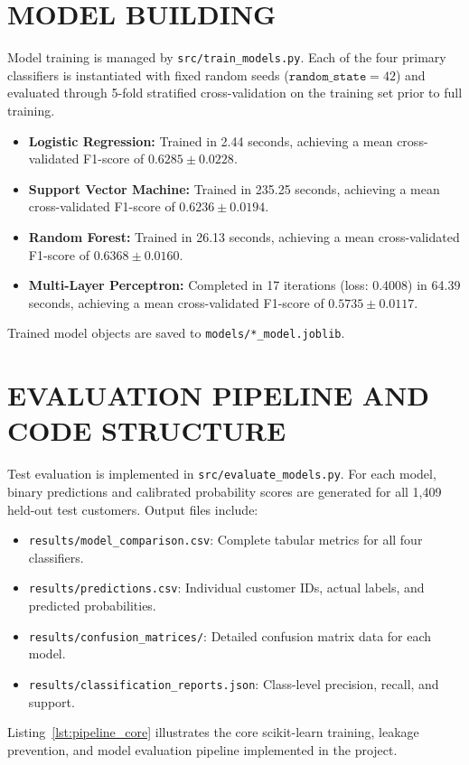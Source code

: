 \section{MODEL BUILDING}
Model training is managed by \texttt{src/train\_models.py}. Each of the four primary classifiers is instantiated with fixed random seeds ($\texttt{random\_state}=42$) and evaluated through 5-fold stratified cross-validation on the training set prior to full training.
\begin{itemize}
    \item \textbf{Logistic Regression:} Trained in 2.44 seconds, achieving a mean cross-validated F1-score of $0.6285 \pm 0.0228$.
    \item \textbf{Support Vector Machine:} Trained in 235.25 seconds, achieving a mean cross-validated F1-score of $0.6236 \pm 0.0194$.
    \item \textbf{Random Forest:} Trained in 26.13 seconds, achieving a mean cross-validated F1-score of $0.6368 \pm 0.0160$.
    \item \textbf{Multi-Layer Perceptron:} Completed in 17 iterations (loss: 0.4008) in 64.39 seconds, achieving a mean cross-validated F1-score of $0.5735 \pm 0.0117$.
\end{itemize}
Trained model objects are saved to \texttt{models/*\_model.joblib}.

\section{EVALUATION PIPELINE AND CODE STRUCTURE}
Test evaluation is implemented in \texttt{src/evaluate\_models.py}. For each model, binary predictions and calibrated probability scores are generated for all 1,409 held-out test customers. Output files include:
\begin{itemize}
    \item \texttt{results/model\_comparison.csv}: Complete tabular metrics for all four classifiers.
    \item \texttt{results/predictions.csv}: Individual customer IDs, actual labels, and predicted probabilities.
    \item \texttt{results/confusion\_matrices/}: Detailed confusion matrix data for each model.
    \item \texttt{results/classification\_reports.json}: Class-level precision, recall, and support.
\end{itemize}

Listing~\ref{lst:pipeline_core} illustrates the core scikit-learn training, leakage prevention, and model evaluation pipeline implemented in the project.

